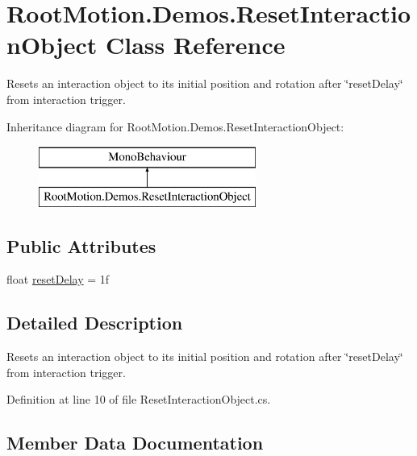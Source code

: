 \hypertarget{class_root_motion_1_1_demos_1_1_reset_interaction_object}{}\section{Root\+Motion.\+Demos.\+Reset\+Interaction\+Object Class Reference}
\label{class_root_motion_1_1_demos_1_1_reset_interaction_object}


Resets an interaction object to it\textquotesingle{}s initial position and rotation after \char`\"{}reset\+Delay\char`\"{} from interaction trigger.  


Inheritance diagram for Root\+Motion.\+Demos.\+Reset\+Interaction\+Object\+:\begin{figure}[H]
\begin{center}
\leavevmode
\includegraphics[height=2.000000cm]{class_root_motion_1_1_demos_1_1_reset_interaction_object}
\end{center}
\end{figure}
\subsection*{Public Attributes}
\begin{DoxyCompactItemize}
\item 
float \mbox{\hyperlink{class_root_motion_1_1_demos_1_1_reset_interaction_object_aec9b6b385b51ff5c556ac0868c035255}{reset\+Delay}} = 1f
\end{DoxyCompactItemize}


\subsection{Detailed Description}
Resets an interaction object to it\textquotesingle{}s initial position and rotation after \char`\"{}reset\+Delay\char`\"{} from interaction trigger. 



Definition at line 10 of file Reset\+Interaction\+Object.\+cs.



\subsection{Member Data Documentation}
\mbox{\label{class_root_motion_1_1_demos_1_1_reset_interaction_object_aec9b6b385b51ff5c556ac0868c035255}} 
